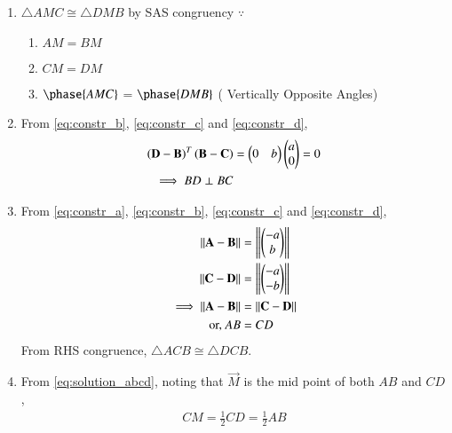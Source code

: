 \renewcommand{\theequation}{\theenumi}
\begin{enumerate}[label=\thesection.\arabic*.,ref=\thesection.\theenumi]
	
\item $\triangle AMC \cong \triangle DMB$  by SAS congruency $\because$
\begin{enumerate}
\item $AM = BM$
\item $CM = DM$
\item $\phase{AMC}$ = $\phase{DMB}$ ( Vertically Opposite Angles)
\end{enumerate}
%
\item From \eqref{eq:constr_b}, \eqref{eq:constr_c} and \eqref{eq:constr_d},
%
%
\begin{align}
\left(\mathbf{D}-\mathbf{B}\right)^T
\left(\mathbf{B}-\mathbf{C}\right) &= \begin{pmatrix}0 & b\end{pmatrix}\begin{pmatrix}a \\ 0\end{pmatrix} = 0
\\
\implies BD \perp BC
\end{align}
%
\item From \eqref{eq:constr_a}, \eqref{eq:constr_b}, \eqref{eq:constr_c} and \eqref{eq:constr_d},
\begin{align}
\left\lVert\mathbf{A}-\mathbf{B}\right\rVert &= \left\lVert\begin{pmatrix}-a \\ b\end{pmatrix}\right\rVert
\\
\left\lVert\mathbf{C}-\mathbf{D}\right\rVert &= \left\lVert\begin{pmatrix}-a \\ -b\end{pmatrix}\right\rVert
\\
\implies \left\lVert\mathbf{A}-\mathbf{B}\right\rVert &= \left\lVert\mathbf{C}-\mathbf{D}\right\rVert\\
\text{or, } AB &=CD
\label{eq:solution_abcd}
\end{align}
%
From RHS congruence,  $\triangle ACB \cong  \triangle DCB$.
\item From \eqref{eq:solution_abcd}, noting that $\vec{M}$ is the mid point of both $AB$ and $CD$, 
\begin{align}
CM = \frac{1}{2}CD =\frac{1}{2} AB
\end{align}



\end{enumerate}
